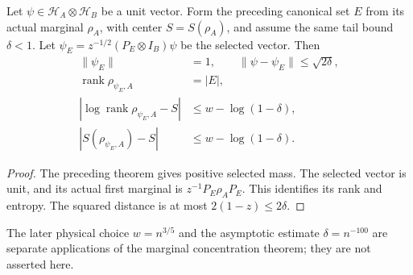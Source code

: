 \begin{theorem}
\label{thm:entropy_typical_pure_state_from_tail}
\leanok
{}
Let $\psi\in\mathcal H_A\otimes\mathcal H_B$ be a unit vector. Form the preceding
canonical set $E$ from its actual marginal $\rho_A$, with center $S=S(\rho_A)$,
and assume the same tail bound $\delta<1$. Let
$\psi_E=z^{-1/2}(P_E\otimes I_B)\psi$ be the selected vector. Then
\begin{align}
 \|\psi_E\|&=1,\qquad \|\psi-\psi_E\|\le\sqrt{2\delta},\\
 \operatorname{rank}\rho_{\psi_E,A}&=|E|,\\
 |\log\operatorname{rank}\rho_{\psi_E,A}-S|&\le w-\log(1-\delta),\\
 |S(\rho_{\psi_E,A})-S|&\le w-\log(1-\delta).
\end{align}
\end{theorem}
\begin{proof}
\leanok
The preceding theorem gives positive selected mass. The selected vector is
unit, and its actual first marginal is $z^{-1}P_E\rho_AP_E$. This identifies its
rank and entropy. The squared distance is at most $2(1-z)\le2\delta$.
\end{proof}

The later physical choice $w=n^{3/5}$ and the asymptotic estimate
$\delta=n^{-100}$ are separate applications of the marginal concentration
theorem; they are not asserted here.
